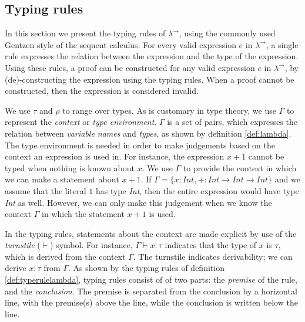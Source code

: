 \subsection{Typing rules}
In this section we present the typing rules of $\lambda^\rightarrow$, using the commonly used Gentzen style of the sequent calculus\cite{gentzen1935untersuchungen}.
For every valid expression $e$ in $\lambda^\rightarrow$, a single rule expresses the relation between the expression and the type of the expression.
Using these rules, a proof can be constructed for any valid expression $e$ in $\lambda^\rightarrow$, by (de)-constructing the expression using the typing rules.
When a proof cannot be constructed, then the expression is considered invalid.

We use $\tau$ and $\rho$ to range over types.
As is customary in type theory, we use $\Gamma$ to represent the \textit{context} or \textit{type environment}.
$\Gamma$ is a set of pairs, which expresses the relation between \textit{variable names} and \textit{types}, as shown by definition \ref{def:lambda}.
The type environment is needed in order to make judgements based on the context an expression is used in.
For instance, the expression $x + 1$ cannot be typed when nothing is known about $x$. 
We use $\Gamma$ to provide the context in which we can make a statement about $x+1$. 
If $\Gamma = \{ x : \textit{Int}, + : \textit{Int} \rightarrow \textit{Int} \rightarrow \textit{Int} \}$ and we assume that the literal $1$ has type \textit{Int}, then the entire expression would have type \textit{Int} as well.
However, we can only make this judgement when we know the context $\Gamma$ in which the statement $x+1$ is used.

In the typing rules, statements about the context are made explicit by use of the \textit{turnstile} ($\vdash$) symbol.
For instance, $\Gamma \vdash x : \tau$ indicates that the type of $x$ is $\tau$, which is derived from the context $\Gamma$.
The turnstile indicates derivability; we can derive $x : \tau$ from $\Gamma$.
As shown by the typing rules of definition \ref{def:typerulelambda}, typing rules consist of of two parts: the \textit{premise} of the rule, and the \textit{conclusion}.
The premise is separated from the conclusion by a horizontal line, with the premise(s) above the line, while the conclusion is written below the line.

